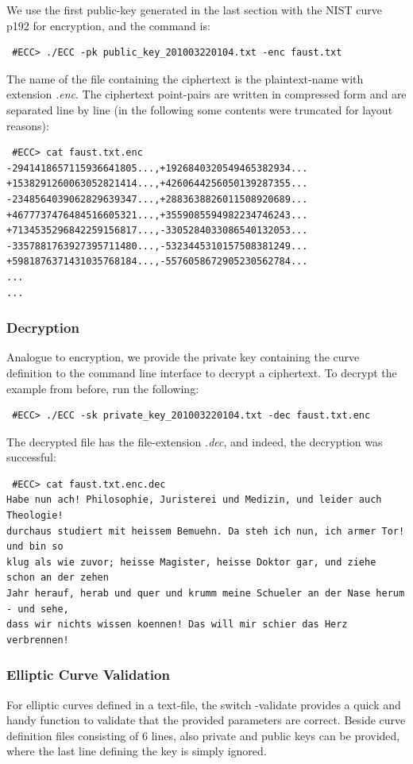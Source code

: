 \documentclass[11pt,english]{article}
\begin{document}
We use the first public-key generated in the last section with the NIST curve p192 for encryption, and the command is:

\begin{verbatim}
 #ECC> ./ECC -pk public_key_201003220104.txt -enc faust.txt
\end{verbatim}

The name of the file containing the ciphertext is the plaintext-name with extension \emph{.enc}. The ciphertext point-pairs are written in compressed form and are separated line by line (in the following some contents were truncated for layout reasons):

\begin{verbatim}
 #ECC> cat faust.txt.enc
-2941418657115936641805...,+1926840320549465382934...
+1538291260063052821414...,+4260644256050139287355...
-2348564039062829639347...,+2883638826011508920689...
+4677737476484516605321...,+3559085594982234746243...
+7134535296842259156817...,-3305284033086540132053...
-3357881763927395711480...,-5323445310157508381249...
+5981876371431035768184...,-5576058672905230562784...
...
...
\end{verbatim}

\subsubsection{Decryption}
Analogue to encryption, we provide the private key containing the curve definition to the command line interface to decrypt a ciphertext. To decrypt the example from before, run the following:

\begin{verbatim}
 #ECC> ./ECC -sk private_key_201003220104.txt -dec faust.txt.enc
\end{verbatim}

The decrypted file has the file-extension \emph{.dec}, and indeed, the decryption was successful:

\begin{verbatim}
 #ECC> cat faust.txt.enc.dec
Habe nun ach! Philosophie, Juristerei und Medizin, und leider auch Theologie!
durchaus studiert mit heissem Bemuehn. Da steh ich nun, ich armer Tor! und bin so
klug als wie zuvor; heisse Magister, heisse Doktor gar, und ziehe schon an der zehen
Jahr herauf, herab und quer und krumm meine Schueler an der Nase herum - und sehe,
dass wir nichts wissen koennen! Das will mir schier das Herz verbrennen!
\end{verbatim}

\subsubsection{Elliptic Curve Validation}
For elliptic curves defined in a text-file, the switch -validate provides a quick and handy function to validate that the provided parameters are correct. Beside curve definition files consisting of 6 lines, also private and public keys can be provided, where the last line defining the key is simply ignored.
\end{document}
